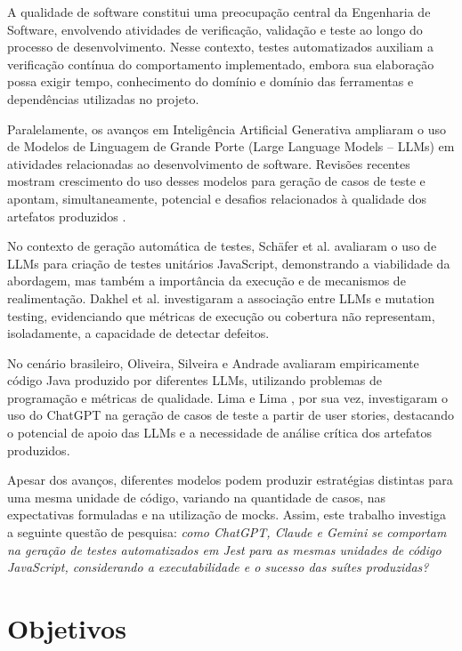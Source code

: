\documentclass[12pt]{article}
\begin{document}
A qualidade de software constitui uma preocupação central da Engenharia de Software, envolvendo atividades de verificação, validação e teste ao longo do processo de desenvolvimento. Nesse contexto, testes automatizados auxiliam a verificação contínua do comportamento implementado, embora sua elaboração possa exigir tempo, conhecimento do domínio e domínio das ferramentas e dependências utilizadas no projeto.

Paralelamente, os avanços em Inteligência Artificial Generativa ampliaram o uso de Modelos de Linguagem de Grande Porte (Large Language Models -- LLMs) em atividades relacionadas ao desenvolvimento de software. Revisões recentes mostram crescimento do uso desses modelos para geração de casos de teste e apontam, simultaneamente, potencial e desafios relacionados à qualidade dos artefatos produzidos \cite{tasarsu2026slr}.

No contexto de geração automática de testes, Schäfer et al. \cite{schaefer2024testpilot} avaliaram o uso de LLMs para criação de testes unitários JavaScript, demonstrando a viabilidade da abordagem, mas também a importância da execução e de mecanismos de realimentação. Dakhel et al. \cite{dakhel2024mutap} investigaram a associação entre LLMs e mutation testing, evidenciando que métricas de execução ou cobertura não representam, isoladamente, a capacidade de detectar defeitos.

No cenário brasileiro, Oliveira, Silveira e Andrade \cite{oliveira2025qualidade} avaliaram empiricamente código Java produzido por diferentes LLMs, utilizando problemas de programação e métricas de qualidade. Lima e Lima \cite{lima2026llms}, por sua vez, investigaram o uso do ChatGPT na geração de casos de teste a partir de user stories, destacando o potencial de apoio das LLMs e a necessidade de análise crítica dos artefatos produzidos.

Apesar dos avanços, diferentes modelos podem produzir estratégias distintas para uma mesma unidade de código, variando na quantidade de casos, nas expectativas formuladas e na utilização de mocks. Assim, este trabalho investiga a seguinte questão de pesquisa: \textit{como ChatGPT, Claude e Gemini se comportam na geração de testes automatizados em Jest para as mesmas unidades de código JavaScript, considerando a executabilidade e o sucesso das suítes produzidas?}

\section{Objetivos}
\end{document}
